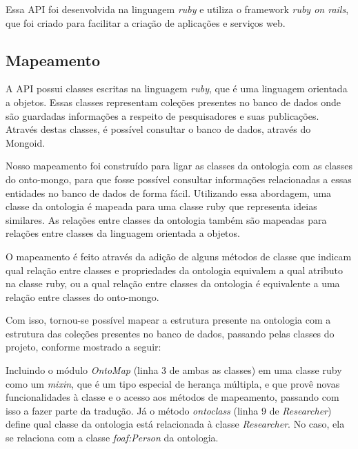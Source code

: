 Essa API foi desenvolvida na linguagem \textit{ruby} e utiliza o framework
\textit{ruby on rails}, que foi criado para facilitar a criação de aplicações e
serviços web.

\subsection{Mapeamento}
A API possui classes escritas na linguagem \textit{ruby}, que é uma linguagem
orientada a objetos. Essas classes representam coleções presentes no banco de
dados onde são guardadas informações a respeito de pesquisadores e suas
publicações. Através destas classes, é possível consultar o banco de dados,
através do Mongoid.

Nosso mapeamento foi construído para ligar as classes da ontologia com as
classes do onto-mongo, para que fosse possível consultar informações
relacionadas a essas entidades no banco de dados de forma fácil. Utilizando essa
 abordagem, uma classe da ontologia é mapeada para uma classe ruby que
 representa ideias similares. As relações entre classes da ontologia também são
 mapeadas para relações entre classes da linguagem orientada a objetos.

O mapeamento é feito através da adição de alguns métodos de classe que indicam
qual relação entre classes e propriedades da ontologia equivalem a qual atributo
 na classe ruby, ou a qual relação entre classes da ontologia é equivalente a
 uma relação entre classes do onto-mongo.

Com isso, tornou-se possível mapear a estrutura presente na ontologia com a
estrutura das coleções presentes no banco de dados, passando pelas classes do
projeto, conforme mostrado a seguir:

% 

% 

Incluindo o módulo \textit{OntoMap} (linha 3 de ambas as classes) em uma classe
ruby como um \textit{mixin}, que é um tipo especial de herança múltipla, e que
provê novas funcionalidades à classe e o acesso aos métodos de mapeamento,
passando com isso a fazer parte da tradução. Já o método \textit{ontoclass}
(linha 9 de \textit{Researcher}) define qual classe da ontologia está
relacionada à classe \textit{Researcher}. No caso, ela se relaciona com a
classe \textit{foaf:Person} da ontologia.

